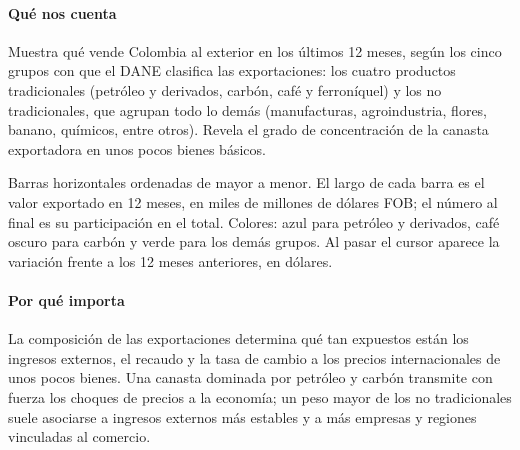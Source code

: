 \paragraph{Qué nos cuenta}
Muestra qué vende Colombia al exterior en los últimos 12 meses, según los cinco grupos con que el DANE clasifica las exportaciones: los cuatro productos tradicionales (petróleo y derivados, carbón, café y ferroníquel) y los no tradicionales, que agrupan todo lo demás (manufacturas, agroindustria, flores, banano, químicos, entre otros). Revela el grado de concentración de la canasta exportadora en unos pocos bienes básicos.

\begin{leer}
Barras horizontales ordenadas de mayor a menor. El largo de cada barra es el valor exportado en 12 meses, en miles de millones de dólares FOB; el número al final es su participación en el total. Colores: azul para petróleo y derivados, café oscuro para carbón y verde para los demás grupos. Al pasar el cursor aparece la variación frente a los 12 meses anteriores, en dólares.
\end{leer}

\paragraph{Por qué importa}
La composición de las exportaciones determina qué tan expuestos están los ingresos externos, el recaudo y la tasa de cambio a los precios internacionales de unos pocos bienes. Una canasta dominada por petróleo y carbón transmite con fuerza los choques de precios a la economía; un peso mayor de los no tradicionales suele asociarse a ingresos externos más estables y a más empresas y regiones vinculadas al comercio.

